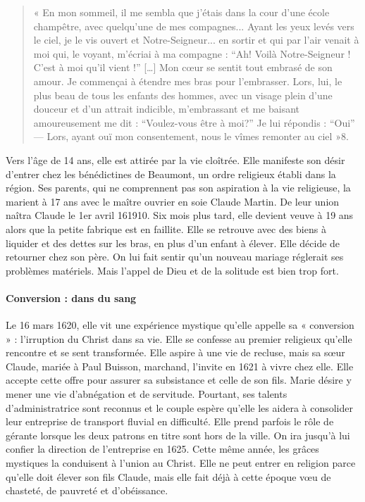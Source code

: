 \begin{quote}
 « En mon sommeil, il me sembla que j’étais dans la cour d’une école champêtre, avec quelqu’une de mes compagnes... Ayant les yeux levés vers le ciel, je le vis ouvert et Notre-Seigneur... en sortir et qui par l’air venait à moi qui, le voyant, m’écriai à ma compagne : “Ah! Voilà Notre-Seigneur ! C’est à moi qu’il vient !” […] Mon cœur se sentit tout embrasé de son amour. Je commençai à étendre mes bras pour l’embrasser. Lors, lui, le plus beau de tous les enfants des hommes, avec un visage plein d’une douceur et d’un attrait indicible, m’embrassant et me baisant amoureusement me dit : “Voulez-vous être à moi?” Je lui répondis : “Oui” — Lors, ayant ouï mon consentement, nous le vîmes remonter au ciel »8.   
\end{quote} 

Vers l’âge de 14 ans, elle est attirée par la vie cloîtrée. Elle manifeste son désir d'entrer chez les bénédictines de Beaumont, un ordre religieux établi dans la région. Ses parents, qui ne comprennent pas son aspiration à la vie religieuse, la marient à 17 ans avec le maître ouvrier en soie Claude Martin. De leur union naîtra Claude le 1er avril 161910. Six mois plus tard, elle devient veuve à 19 ans alors que la petite fabrique est en faillite. Elle se retrouve avec des biens à liquider et des dettes sur les bras, en plus d'un enfant à élever. Elle décide de retourner chez son père. On lui fait sentir qu'un nouveau mariage réglerait ses problèmes matériels. Mais l'appel de Dieu et de la solitude est bien trop fort.

\paragraph{Conversion : dans du sang}
Le 16 mars 1620, elle vit une expérience mystique qu'elle appelle sa « conversion » : l'irruption du Christ dans sa vie. Elle se confesse au premier religieux qu'elle rencontre et se sent transformée. Elle aspire à une vie de recluse, mais sa sœur Claude, mariée à Paul Buisson, marchand, l'invite en 1621 à vivre chez elle. Elle accepte cette offre pour assurer sa subsistance et celle de son fils. Marie désire y mener une vie d’abnégation et de servitude. Pourtant, ses talents d’administratrice sont reconnus et le couple espère qu'elle les aidera à consolider leur entreprise de transport fluvial en difficulté. Elle prend parfois le rôle de gérante lorsque les deux patrons en titre sont hors de la ville. On ira jusqu'à lui confier la direction de l'entreprise en 1625. Cette même année, les grâces mystiques la conduisent à l'union au Christ. Elle ne peut entrer en religion parce qu'elle doit élever son fils Claude, mais elle fait déjà à cette époque vœu de chasteté, de pauvreté et d'obéissance.

